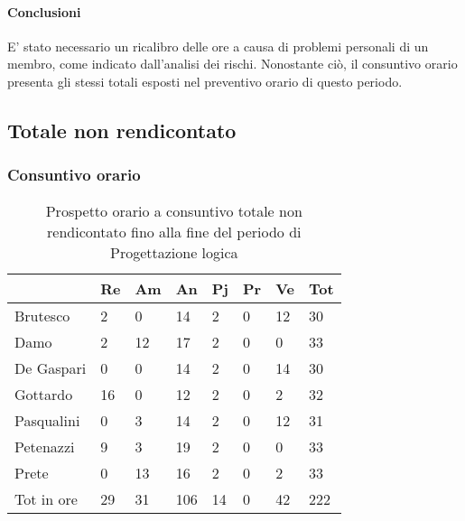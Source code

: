 				
	\paragraph{Conclusioni}
	E' stato necessario un ricalibro delle ore a causa di problemi personali di un membro, come indicato dall'analisi dei rischi. Nonostante ciò, il consuntivo orario presenta gli stessi totali esposti nel preventivo orario di questo periodo.
	
	\newpage
	\subsection{Totale non rendicontato}
		\subsubsection{Consuntivo orario}
						\begin{table}[h] \begin{center} \begin{tabular}{llllllll}																						
						\toprule
									&	Re		&	Am		&	An		&	Pj		&	Pr		&	Ve		&	Tot	 \\ 	
						\midrule																					
						Brutesco	&	2		&	0		&	14	&	2		&	0		&	12		&	30	 \\ 	
						Damo		&	2		&	12		&	17	&	2		&	0		&	0		&	33	 \\ 	
						De Gaspari	&	0		&	0		&	14	&	2		&	0		&	14		&	30	 \\ 	
						Gottardo	&	16		&	0		&	12	&	2		&	0		&	2		&	32	 \\ 	
						Pasqualini	&	0		&	3		&	14	&	2		&	0		&	12		&	31	 \\ 	
						Petenazzi	&	9		&	3		&	19	&	2		&	0		&	0		&	33	 \\ 	
						Prete		&	0		&	13		&	16	&	2		&	0		&	2		&	33	 \\ 	
						\midrule																
						Tot in ore	&	29		&	31		&	106		&	14		&	0		&	42		&	222	 \\ 		
						\bottomrule																						
						\end{tabular} \end{center} \caption{Prospetto orario a consuntivo totale non rendicontato fino alla fine del periodo di																						
						Progettazione logica																						
						}\label{tab:oreNonRend} \end{table}							

